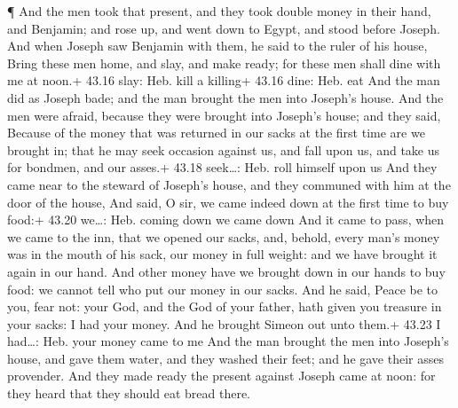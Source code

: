  ¶ And the men took that present, and they took double
money in their hand, and Benjamin; and rose up, and went down to Egypt,
and stood before Joseph.  And when Joseph saw Benjamin with
them, he said to the ruler of his house, Bring these men home, and slay,
and make ready; for these men shall dine with me at noon.+ 43.16 slay:
Heb. kill a killing+ 43.16 dine: Heb. eat  And the man did
as Joseph bade; and the man brought the men into Joseph's house.
 And the men were afraid, because they were brought into
Joseph's house; and they said, Because of the money that was returned in
our sacks at the first time are we brought in; that he may seek occasion
against us, and fall upon us, and take us for bondmen, and our asses.+
43.18 seek\ldots: Heb. roll himself upon us  And they came
near to the steward of Joseph's house, and they communed with him at the
door of the house,  And said, O sir, we came indeed down at
the first time to buy food:+ 43.20 we\ldots: Heb. coming down we came
down  And it came to pass, when we came to the inn, that we
opened our sacks, and, behold, every man's money was in the mouth of his
sack, our money in full weight: and we have brought it again in our
hand.  And other money have we brought down in our hands to
buy food: we cannot tell who put our money in our sacks. 
And he said, Peace be to you, fear not: your God, and the God of your
father, hath given you treasure in your sacks: I had your money. And he
brought Simeon out unto them.+ 43.23 I had\ldots: Heb. your money came
to me  And the man brought the men into Joseph's house, and
gave them water, and they washed their feet; and he gave their asses
provender.  And they made ready the present against Joseph
came at noon: for they heard that they should eat bread there.

